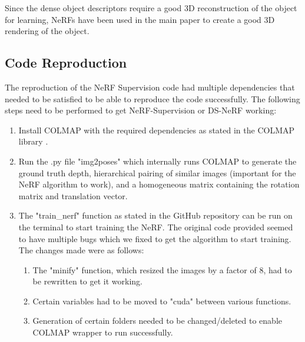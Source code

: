 \documentclass[conference]{IEEEtran}
\begin{document}
Since the dense object descriptors require a good 3D reconstruction of the object for learning, NeRFs have been used in the main paper \cite{yen2022nerfsupervision} to create a good 3D rendering of the object.

\subsection{Code Reproduction}

The reproduction of the NeRF Supervision code had multiple dependencies that needed to be satisfied to be able to reproduce the code successfully. The following steps need to be performed to get NeRF-Supervision or DS-NeRF working: 

\begin{enumerate}
    \item Install COLMAP with the required dependencies as stated in the COLMAP library \cite{schoenberger2016sfm}.
    \item Run the .py file "img2poses" which internally runs COLMAP to generate the ground truth depth, hierarchical pairing of similar images (important for the NeRF algorithm to work), and a homogeneous matrix containing the rotation matrix and translation vector.
    \item The "train\_nerf" function as stated in the GitHub repository can be run on the terminal to start training the NeRF. The original code provided seemed to have multiple bugs which we fixed to get the algorithm to start training. The changes made were as follows:
    
    \begin{enumerate}
        \item The "minify" function, which resized the images by a factor of 8, had to be rewritten to get it working.
        \item Certain variables had to be moved to "cuda" between various functions.
        \item Generation of certain folders needed to be changed/deleted to enable COLMAP wrapper to run successfully.
    \end{enumerate}


\end{enumerate}
\end{document}
